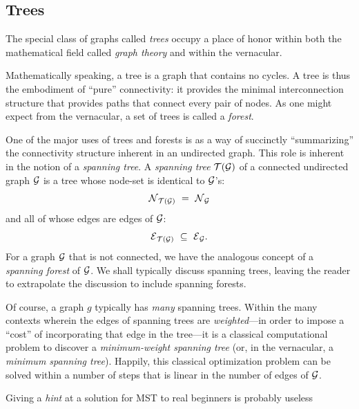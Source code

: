 \subsection{Trees}
\label{sec:Trees}

The special class of graphs called {\it trees} 
 occupy a place of honor within both the mathematical
field called {\it graph theory} and within the vernacular.

Mathematically speaking, a tree is a graph that contains no cycles.  A
tree is thus the embodiment of ``pure'' connectivity: it provides the
minimal interconnection structure that provides paths that connect
every pair of nodes.  As one might expect from the vernacular, a set
of trees is called a {\it forest}. 

One of the major uses of trees and forests is as a way of succinctly
``summarizing'' the connectivity structure inherent in an undirected
graph.  This role is inherent in the notion of a {\it spanning tree}.
 
A {\it spanning tree} $\mbox{$\cal T$}(\mbox{$\cal G$})$ of a connected undirected graph $\mbox{$\cal G$}$ is
a tree whose node-set is identical to $\mbox{$\cal G$}$'s:
\[ \mbox{$\cal N$}_{\mbox{{\scriptsize $\cal T$}}(\mbox{{\scriptsize $\cal G$}})} \ = \ \mbox{$\cal N$}_{\mbox{{\scriptsize $\cal G$}}} \]
and all of whose edges are edges of $\mbox{$\cal G$}$:
\[ \mbox{$\cal E$}_{\mbox{{\scriptsize $\cal T$}}(\mbox{{\scriptsize $\cal G$}})} \ \subseteq \ \mbox{$\cal E$}_{\mbox{{\scriptsize $\cal G$}}}. \]
For a graph $\mbox{$\cal G$}$ that is not connected, we have the analogous concept
of a {\it spanning forest}
 
of $\mbox{$\cal G$}$.  We shall typically discuss spanning trees, leaving the
reader to extrapolate the discussion to include spanning forests.

Of course, a graph $g$ typically has {\em many} spanning trees.
Within the many contexts wherein the edges of spanning trees are {\em
  weighted}---in order to impose a ``cost'' of incorporating that edge
in the tree---it is a classical computational problem to discover a
{\em minimum-weight spanning tree}   (or, in the
vernacular, a {\em minimum spanning tree}).  Happily, this classical
optimization problem can be solved within a number of steps that is
linear in the number of edges of $\mbox{$\cal G$}$.

{\Arny Giving a {\em hint} at a solution for MST to real beginners is
  probably useless}

